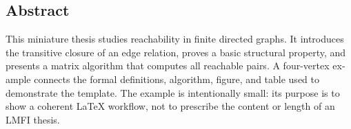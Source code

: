 \begin{otherlanguage}{english}
\chapter*{Abstract}


This miniature thesis studies reachability in finite directed graphs. It introduces
the transitive closure of an edge relation, proves a basic structural property, and
presents a matrix algorithm that computes all reachable pairs. A four-vertex
example connects the formal definitions, algorithm, figure, and table used to
demonstrate the template. The example is intentionally small: its purpose is to
show a coherent LaTeX workflow, not to prescribe the content or length of an LMFI
thesis.

\medskip
\noindent\textbf{\TemplateKeywordsLabel} \ThesisKeywordsEN
\end{otherlanguage}
